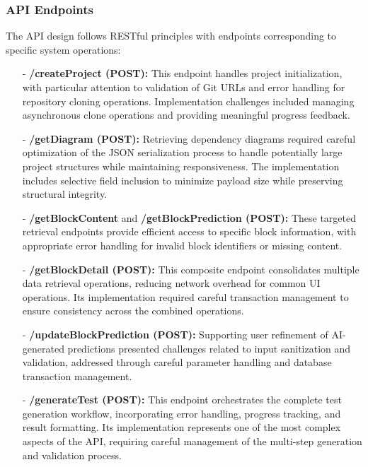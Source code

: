 \subsubsection{API Endpoints}

The API design follows RESTful principles with endpoints corresponding to specific system operations:

\begin{itemize}
    \item[-] \textbf{/createProject (POST):} 
    This endpoint handles project initialization, with particular attention to validation of Git URLs and error handling for repository cloning operations. Implementation challenges included managing asynchronous clone operations and providing meaningful progress feedback.

    \item[-] \textbf{/getDiagram (POST):} 
    Retrieving dependency diagrams required careful optimization of the JSON serialization process to handle potentially large project structures while maintaining responsiveness. The implementation includes selective field inclusion to minimize payload size while preserving structural integrity.

    \item[-] \textbf{/getBlockContent} and \textbf{/getBlockPrediction (POST):} 
    These targeted retrieval endpoints provide efficient access to specific block information, with appropriate error handling for invalid block identifiers or missing content.

    \item[-] \textbf{/getBlockDetail (POST):} 
    This composite endpoint consolidates multiple data retrieval operations, reducing network overhead for common UI operations. Its implementation required careful transaction management to ensure consistency across the combined operations.

    \item[-] \textbf{/updateBlockPrediction (POST):} 
    Supporting user refinement of AI-generated predictions presented challenges related to input sanitization and validation, addressed through careful parameter handling and database transaction management.

    \item[-] \textbf{/generateTest (POST):} 
    This endpoint orchestrates the complete test generation workflow, incorporating error handling, progress tracking, and result formatting. Its implementation represents one of the most complex aspects of the API, requiring careful management of the multi-step generation and validation process.
\end{itemize}

